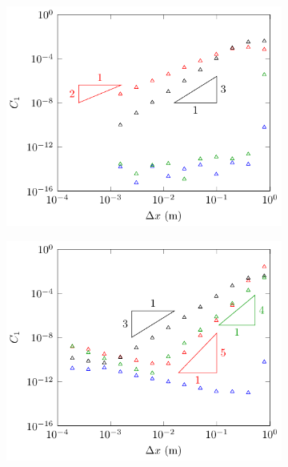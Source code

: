 \begin{figure}
\begin{subfigure}{0.5\textwidth}
		\includegraphics[width=\textwidth]{./chp5/figures/Analytic/Soliton/C1/FEVM2.pdf}
	\end{subfigure}%
	\begin{subfigure}{0.5\textwidth}
		\includegraphics[width=\textwidth]{./chp5/figures/Analytic/Soliton/C1/FDVM3.pdf}
	\end{subfigure}
	\begin{subfigure}{0.5\textwidth}

\end{subfigure}
\end{figure}
